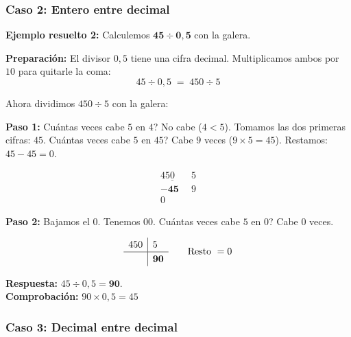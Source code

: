 \documentclass[12pt, letterpaper]{article}
\begin{document}
\newpage %

\subsubsection*{Caso 2: Entero entre decimal}

\noindent\textbf{Ejemplo resuelto 2:} Calculemos $\boldsymbol{45 \div 0{,}5}$ con la galera.

\begin{cuadrosolucion}
  \textbf{Preparación:} El divisor $0{,}5$ tiene una cifra decimal. Multiplicamos ambos por $10$ para quitarle la coma:
  \[
    45 \div 0{,}5 \;=\; 450 \div 5
  \]

  Ahora dividimos $450 \div 5$ con la galera:

  \textbf{Paso 1:} \textquestiondown Cuántas veces cabe $5$ en $4$? No cabe ($4 < 5$). Tomamos las dos primeras cifras: $45$. \textquestiondown Cuántas veces cabe $5$ en $45$? Cabe $9$ veces ($9 \times 5 = 45$). Restamos: $45 - 45 = 0$.

  \[
    \renewcommand{\arraystretch}{1.2}
    \begin{array}{r|l}
      45\underline{0}         & 5 \\ \hline
      \mathbf{-45}\phantom{0} & 9 \\
      0\phantom{0}            &
    \end{array}
  \]

  \textbf{Paso 2:} Bajamos el $0$. Tenemos $00$. \textquestiondown Cuántas veces cabe $5$ en $0$? Cabe $0$ veces.

  \[
    \renewcommand{\arraystretch}{1.2}
    \begin{array}{r|l}
      450 & 5               \\ \hline
          & \boldsymbol{90} \\
    \end{array}
    \qquad \text{Resto } = 0
  \]

  \textbf{Respuesta:} $45 \div 0{,}5 = \boldsymbol{90}$.\\
  \textbf{Comprobación:} $90 \times 0{,}5 = 45$ \checkmark
\end{cuadrosolucion}

\subsubsection*{Caso 3: Decimal entre decimal}
\end{document}
